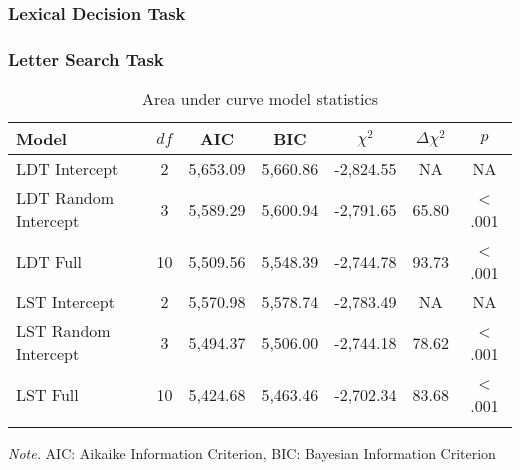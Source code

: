 \documentclass[english,man]{apa6}
\theoremstyle{definition}
\theoremstyle{definition}
\theoremstyle{definition}
\theoremstyle{remark}
\begin{document}
\subsubsection{Lexical Decision Task}\label{lexical-decision-task}

\subsubsection{Letter Search Task}\label{letter-search-task}

\begin{table}[tbp]
\begin{center}
\begin{threeparttable}
\caption{\label{tab:area-table-model}Area under curve model statistics}
\begin{tabular}{lcccccc}
\toprule
Model & $df$ & AIC & BIC & $\chi^2$ & $\Delta\chi^2$ & $p$\\
\midrule
LDT Intercept & 2 & 5,653.09 & 5,660.86 & -2,824.55 & NA & NA\\
LDT Random Intercept & 3 & 5,589.29 & 5,600.94 & -2,791.65 & 65.80 & < .001\\
LDT Full & 10 & 5,509.56 & 5,548.39 & -2,744.78 & 93.73 & < .001\\
LST Intercept & 2 & 5,570.98 & 5,578.74 & -2,783.49 & NA & NA\\
LST Random Intercept & 3 & 5,494.37 & 5,506.00 & -2,744.18 & 78.62 & < .001\\
LST Full & 10 & 5,424.68 & 5,463.46 & -2,702.34 & 83.68 & < .001\\
\bottomrule
\addlinespace
\end{tabular}
\begin{tablenotes}[para]
\textit{Note.} AIC: Aikaike Information Criterion, BIC: Bayesian Information Criterion
\end{tablenotes}
\end{threeparttable}
\end{center}
\end{table}
\end{document}
